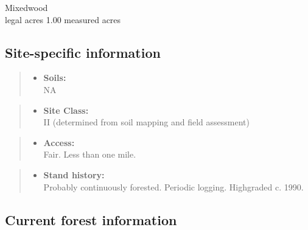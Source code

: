 \documentclass[]{tufte-handout}
\providecommand{\tightlist}{%
  \setlength{\itemsep}{0pt}\setlength{\parskip}{0pt}}
\begin{document}
Mixedwood\\
 legal acres \textbar{} 1.00 measured acres

\subsection{Site-specific
information}\label{site-specific-information-2}

\begin{quote}
\begin{itemize}
\tightlist
\item
  \textbf{Soils:}\\
  \indent\indent  NA
\end{itemize}
\end{quote}

\begin{quote}
\begin{itemize}
\tightlist
\item
  \textbf{Site Class:}\\
  \vspace{2pt} II (determined from soil mapping and field assessment)
\end{itemize}
\end{quote}

\begin{quote}
\begin{itemize}
\tightlist
\item
  \textbf{Access:}\\
  \vspace{2pt} Fair. Less than one mile.
\end{itemize}
\end{quote}

\begin{quote}
\begin{itemize}
\tightlist
\item
  \textbf{Stand history:}\\
  \vspace{2pt} Probably continuously forested. Periodic logging.
  Highgraded c. 1990.
\end{itemize}
\end{quote}

\subsection{Current forest
information}\label{current-forest-information-2}
\end{document}
